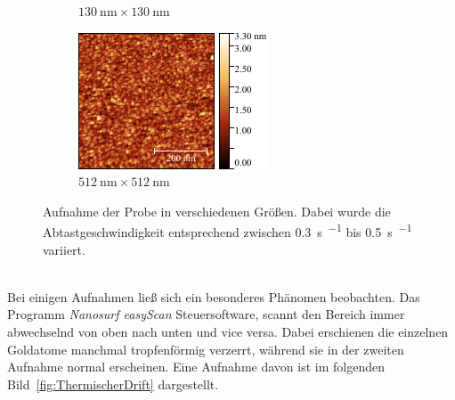 \documentclass[a4paper,twoside,final]{article}
\begin{document}
\begin{figure}[htp]
\begin{subfigure}{0.3\textwidth}
        \caption{$\SI{130}{\nano\metre}\times\SI{130}{\nano\metre}$}
    \end{subfigure}
    \hspace{0.5cm}
    \begin{subfigure}{0.3\textwidth}
        \includegraphics[width=\textwidth]{Bilder/Image01986_512nm.pdf}
        \caption{$\SI{512}{\nano\metre}\times\SI{512}{\nano\metre}$}
    \end{subfigure}
    \caption{Aufnahme der Probe in verschiedenen Größen. Dabei wurde die Abtastgeschwindigkeit entsprechend zwischen \SI{0,3}{\second\per{}} bis \SI{0,5}{\second\per{}} variiert.}
    \label{fig:verschiedeneGroesse}
\end{figure}\\
Bei einigen Aufnahmen ließ sich ein besonderes Phänomen beobachten. Das Programm \textit{Nanosurf easyScan} Steuersoftware, scannt den Bereich immer abwechselnd von oben nach unten und vice versa. Dabei erschienen die einzelnen Goldatome manchmal tropfenförmig verzerrt, während sie in der zweiten Aufnahme normal erscheinen. Eine Aufnahme davon ist im folgenden Bild~\ref{fig:ThermischerDrift} dargestellt.
\end{document}
